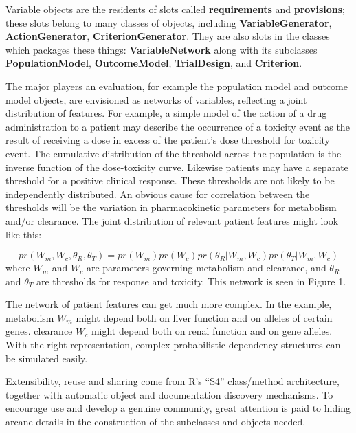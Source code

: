 \documentclass[12pt]{amsart}
\newcommand{\Rcode}[1]{{\textbf{#1}}}
\begin{document}
Variable objects are the residents of  slots called \Rcode{requirements}
and \Rcode{provisions}; these slots belong to many classes of objects,
including \Rcode{VariableGenerator}, \Rcode{ActionGenerator},
 \Rcode{CriterionGenerator}. They are also slots in the classes 
 which packages these things:  \Rcode{VariableNetwork} along with
 its subclasses \Rcode{PopulationModel}, \Rcode{OutcomeModel},  \Rcode{TrialDesign},
 and \Rcode{Criterion}.

The major players an evaluation, for example
the population model and  outcome model objects, are envisioned as  networks of variables,
reflecting a joint distribution of features.
For example, a simple model of the action of a drug administration to a patient
may describe the occurrence of a toxicity event as
the result of receiving a dose in excess of the patient's 
dose threshold for toxicity event. The  cumulative distribution
of the threshold across the population is the inverse function of 
the dose-toxicity curve. Likewise patients may have a separate threshold for
a positive clinical response. These thresholds are not likely to
be independently distributed. An obvious cause for correlation between
the thresholds will be the variation in pharmacokinetic parameters
for metabolism and/or clearance.
The joint distribution of relevant patient features  might look like this:

\begin{equation}
pr(W_{m},W_{c},\theta_{R},\theta_{T})
= pr(W_{m}) pr(W_{c})
pr(\theta_{R} | W_{m}, W_{c}) 
pr(\theta_{T} | W_{m}, W_{c})
\end{equation}
where $W_{m}$ and $W_{c}$ are parameters governing metabolism and clearance,
and  $\theta_{R}$ and $\theta_{T}$ are thresholds for response and toxicity.
This network is seen in Figure 1.

The network of patient features can get much more complex.
In the example, metabolism  $W_{m}$ might depend both on liver function and on alleles of certain genes. 
clearance  $W_{c}$ might depend both on renal function and on gene alleles.
With the right representation, complex probabilistic dependency structures can be simulated easily.


Extensibility, reuse and sharing come from R's ``S4'' class/method architecture, 
together with automatic object and documentation discovery mechanisms.
To encourage use and develop a genuine community,
great attention is paid to hiding arcane details in the construction of the
subclasses and objects needed.
\end{document}
